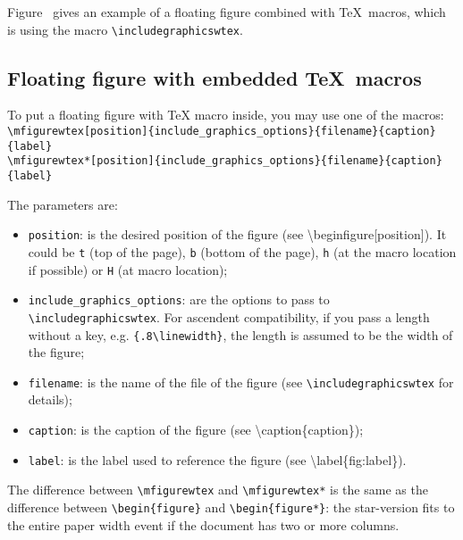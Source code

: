 \documentclass[book]{upmethodology-document}
\begin{document}
Figure~ gives an example of a floating figure combined with \TeX\ macros, which is using the macro \texttt{{\textbackslash}includegraphicswtex}.

\subsection{Floating figure with embedded \TeX\ macros}

To put a floating figure with \TeX\xspace macro inside, you may use one of the macros:
\texttt{{\textbackslash}mfigurewtex[position]\{include\_graphics\_options\}\{filename\}\{caption\}\{label\}} \\
\texttt{{\textbackslash}mfigurewtex*[position]\{include\_graphics\_options\}\{filename\}\{caption\}\{label\}}

The parameters are:
\begin{itemize}
\item \texttt{position}: is the desired position of the figure (see {\textbackslash}begin{figure}[position]). It could be \texttt{t} (top of the page), \texttt{b} (bottom of the page), \texttt{h} (at the macro location if possible) or \texttt{H} (at macro location);

\item \texttt{include\_graphics\_options}: are the options to pass to \texttt{{\textbackslash}includegraphicswtex}. For ascendent compatibility, if you pass a length without a key, e.g. \texttt{\{.8{\textbackslash}linewidth\}}, the length is assumed to be the width of the figure;

\item \texttt{filename}: is the name of the file of the figure (see \texttt{{\textbackslash}includegraphicswtex} for details);

\item \texttt{caption}: is the caption of the figure (see {\textbackslash}caption\{caption\});

\item \texttt{label}: is the label used to reference the figure (see {\textbackslash}label\{fig:label\}).
\end{itemize}

The difference between \texttt{{\textbackslash}mfigurewtex} and \texttt{{\textbackslash}mfigurewtex*} is the same as the difference between \texttt{{\textbackslash}begin\{figure\}} and \texttt{{\textbackslash}begin\{figure*\}}: the star-version fits to the entire paper width event if the document has two or more columns.
\end{document}

